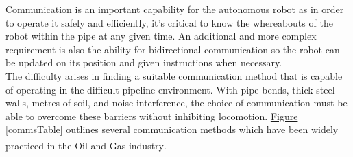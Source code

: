 \documentclass[11pt]{article}		%
\begin{document}
		Communication is an important capability for the autonomous robot as in order to operate it safely and efficiently, it's critical to know the whereabouts of the robot within the pipe at any given time. 
		An additional and more complex requirement is also the ability for bidirectional communication so the robot can be updated on its position and given instructions when necessary. 
		\\
	    The difficulty arises in finding a suitable communication method that is capable of operating in the difficult pipeline environment. 
	    With pipe bends, thick steel walls, metres of soil, and noise interference, the choice of communication must be able to overcome these barriers without inhibiting locomotion. 
	    \hyperref[commsTable]{Figure \ref*{commsTable}} outlines several communication methods which have been widely practiced in the Oil and Gas industry\textsuperscript{\cite{acoustic2020}}.
	    \\
	    
\end{document}
